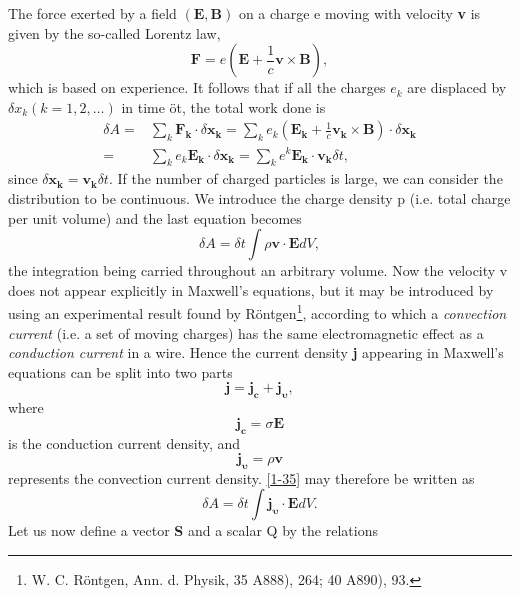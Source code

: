 \documentclass[lang=en,11pt]{elegantbook}
\begin{document}
	The force exerted by a field $(\mathbf{E}, \mathbf{B})$ on a charge e moving with velocity \textbf{v} is given by the so-called Lorentz law,
	\begin{equation}
		\mathbf{F}=e\left(\mathbf{E}+\frac{1}{c}\mathbf{v}\times\mathbf{B}\right),
		\label{1-34}
	\end{equation}
	which is based on experience. It follows that if all the charges $e_k$ are displaced by $\delta x_k
	(k =1, 2, \dots)$ in time öt, the total work done is
	\begin{equation*}
		\begin{aligned}
		\delta A=&\sum_{k}\mathbf{F_k}\cdot\delta\mathbf{x_k}=\sum_{k}e_k\left(\mathbf{E_k}+\frac{1}{c}\mathbf{v_k}\times\mathbf{B}\right)\cdot\delta\mathbf{x_k}\\
		=&\sum_{k}e_k\mathbf{E_k}\cdot\delta\mathbf{x_k}=\sum_{k}e^k\mathbf{E_k}\cdot\mathbf{v_k}\delta t,
		\end{aligned}
	\end{equation*}
	since $\delta\mathbf{x_k} =\mathbf{v_k}\delta t$. If the number of charged particles is large, we can consider the distribution to be continuous. We introduce the charge density p (i.e. total charge per	unit volume) and the last equation becomes
	\begin{equation}
		\delta A=\delta t\int\rho\mathbf{v\cdot E}dV,
		\label{1-35}
	\end{equation}
	the integration being carried throughout an arbitrary volume. Now the velocity v does not appear explicitly in Maxwell's equations, but it may be introduced by using an	experimental result found by Röntgen\footnote{W. C. Röntgen, Ann. d. Physik, 35 A888), 264; 40 A890), 93.}, according to which a \textit{convection current} (i.e. a	set of moving charges) has the same electromagnetic effect as a \textit{conduction current} in a wire. Hence the current density \textbf{j} appearing in Maxwell's equations can be split into two parts
	\begin{equation}
		\mathbf{j}=\mathbf{j_c}+\mathbf{j_\upsilon},
		\label{1-36}
	\end{equation}
	where
	$$\mathbf{j_c}=\sigma\mathbf{E}$$
	is the conduction current density, and
	$$\mathbf{j_\upsilon}=\rho\mathbf{v}$$
	represents the convection current density. \eqref{1-35} may therefore be written as
	\begin{equation}
		\delta A=\delta t\int\mathbf{j_\upsilon\cdot E}dV.
		\label{1-37}
	\end{equation}
	Let us now define a vector \textbf{S} and a scalar Q by the relations
\end{document}
